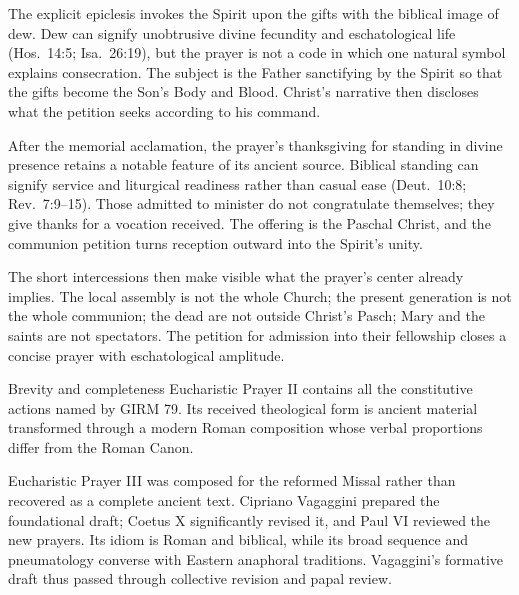 The explicit epiclesis invokes the Spirit upon the gifts with the biblical image of dew. Dew can signify unobtrusive divine fecundity and eschatological life (Hos.~14:5; Isa.~26:19), but the prayer is not a code in which one natural symbol explains consecration. The subject is the Father sanctifying by the Spirit so that the gifts become the Son's Body and Blood. Christ's narrative then discloses what the petition seeks according to his command.

After the memorial acclamation, the prayer's thanksgiving for standing in divine presence retains a notable feature of its ancient source. Biblical standing can signify service and liturgical readiness rather than casual ease (Deut.~10:8; Rev.~7:9--15). Those admitted to minister do not congratulate themselves; they give thanks for a vocation received. The offering is the Paschal Christ, and the communion petition turns reception outward into the Spirit's unity.

The short intercessions then make visible what the prayer's center already implies. The local assembly is not the whole Church; the present generation is not the whole communion; the dead are not outside Christ's Pasch; Mary and the saints are not spectators. The petition for admission into their fellowship closes a concise prayer with eschatological amplitude.

\begin{studybox}{Brevity and completeness}
Eucharistic Prayer II contains all the constitutive actions named by GIRM 79. Its received theological form is ancient material transformed through a modern Roman composition whose verbal proportions differ from the Roman Canon.
\end{studybox}


Eucharistic Prayer III was composed for the reformed Missal rather than recovered as a complete ancient text. Cipriano Vagaggini prepared the foundational draft; Coetus X significantly revised it, and Paul VI reviewed the new prayers. Its idiom is Roman and biblical, while its broad sequence and pneumatology converse with Eastern anaphoral traditions. Vagaggini's formative draft thus passed through collective revision and papal review.

